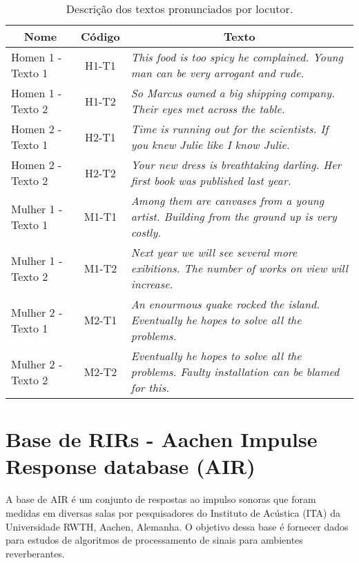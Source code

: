 \begin{table} [H]
    \centering
    \caption{Descrição dos textos pronunciados por locutor.}
    \label{tbl:voice}
    \begin{tabularx}{\textwidth}{l|c|p{9cm}} 
        
        \multicolumn{1}{c}{\textbf{Nome}} & \multicolumn{1}{|c}{\textbf{Código}} & \multicolumn{1}{|c}{\textbf{Texto}} \\
        \hline 

        Homen 1 - Texto 1 & H1-T1 & \textit{This food is too spicy he complained. Young man can be very arrogant and rude.} \\
        Homen 1 - Texto 2 & H1-T2 & \textit{So Marcus owned a big shipping company. Their eyes met across the table.} \\
        Homen 2 - Texto 1 & H2-T1 & \textit{Time is running out for the scientists. If you knew Julie like I know Julie.} \\
        Homen 2 - Texto 2 & H2-T2 & \textit{Your new dress is breathtaking darling. Her first book was published last year.} \\
        Mulher 1 - Texto 1 & M1-T1 & \textit{Among them are canvases from a young artist. Building from the ground up is very costly.} \\
        Mulher 1 - Texto 2 & M1-T2 & \textit{Next year we will see several more exibitions. The number of works on view will increase.} \\
        Mulher 2 - Texto 1 & M2-T1 & \textit{An enourmous quake rocked the island. Eventually he hopes to solve all the problems.} \\
        Mulher 2 - Texto 2 & M2-T2 & \textit{Eventually he hopes to solve all the problems. Faulty installation can be blamed for this.} \\
        
    \end{tabularx}
\end{table}

\section{Base de RIRs - Aachen Impulse Response database (AIR)}

A base de AIR \cite{AIR_Database} é um conjunto de respostas ao impulso sonoras que foram medidas em diversas salas
por pesquisadores do Instituto de Acústica (ITA) da Universidade RWTH, Aachen, Alemanha.
O objetivo dessa base é fornecer dados para estudos de algoritmos de processamento de sinais para ambientes reverberantes.


